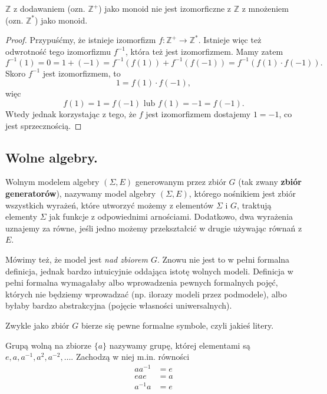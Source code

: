 \begin{example}
$\mathbb{Z}$ z dodawaniem (ozn. $\mathbb{Z}^+$)
	jako monoid nie jest izomorficzne z $\mathbb{Z}$ z mnożeniem (ozn. $\mathbb{Z}^*$)
	jako monoid.
\end{example}
\begin{proof}
Przypuśćmy, że istnieje izomorfizm $f: \mathbb{Z}^+ \to \mathbb{Z}^*$. Istnieje więc też odwrotność tego izomorfizmu $f^{-1}$, która też jest izomorfizmem. Mamy zatem
\begin{equation}
    f^{-1}(1) = 0 = 1 + (-1) = f^{-1}(f(1)) + f^{-1}(f(-1)) = f^{-1}(f(1) \cdot f(-1)).
\end{equation}
Skoro $f^{-1}$ jest izomorfizmem, to 
\begin{equation}
    1 = f(1) \cdot f(-1), 
\end{equation}
więc
\begin{equation}
    f(1) = 1 = f(-1) \text{ lub } f(1) = -1 = f(-1).
\end{equation}
Wtedy jednak korzystając z tego, że $f$ jest izomorfizmem dostajemy $1 = -1$, co jest sprzecznością.
\end{proof}

\subsection{Wolne algebry.}

\begin{definition}
    Wolnym modelem algebry $(\Sigma, E)$ generowanym przez zbiór $G$ (tak zwany \textbf{zbiór generatorów}),
    nazywamy model algebry $(\Sigma, E)$, którego nośnikiem jest zbiór wszystkich wyrażeń,
		które utworzyć możemy z elementów $\Sigma$ i $G$, traktują elementy $\Sigma$ jak
		funkcje z odpowiednimi arnościami.
	Dodatkowo,
		dwa wyrażenia uznajemy za równe,
		jeśli jedno możemy przekształcić w drugie używając równań z $E$.
\end{definition}
Mówimy też, że model jest \textit{nad zbiorem $G$}.
Znowu nie jest to w pełni formalna definicja,
	jednak bardzo intuicyjnie oddająca istotę wolnych modeli.
Definicja w pełni formalna wymagałaby albo wprowadzenia pewnych formalnych pojęć,
	których nie będziemy wprowadzać (np. ilorazy modeli przez podmodele),
	albo byłaby bardzo abstrakcyjna (pojęcie własności uniwersalnych).

Zwykle jako zbiór $G$ bierze się pewne formalne symbole, czyli jakieś litery.

\begin{example}
	Grupą wolną na zbiorze $\{a\}$ nazywamy grupę, której elementami są
	$e, a, a^{-1}, a^2, a^{-2}, \dots$.
	Zachodzą w niej m.in. równości
	\begin{align}
		aa^{-1} &= e \\
		eae &= a \\
		a^{-1}a &= e
	\end{align}
\end{example}

